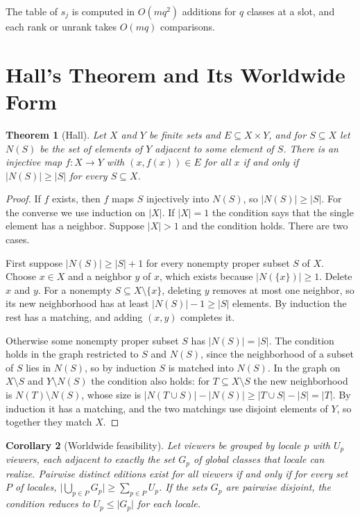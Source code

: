 \documentclass[11pt,twoside,openright]{book}
\theoremstyle{plain}
\newtheorem{theorem}{Theorem}[chapter]
\newtheorem{corollary}[theorem]{Corollary}
\theoremstyle{definition}
\theoremstyle{remark}
\begin{document}
The table of $s_j$ is computed in $O(m q^2)$ additions for $q$ classes at a slot, and each rank or unrank takes $O(mq)$ comparisons.

\section{Hall's Theorem and Its Worldwide Form}\label{sec:hallapp}

\begin{theorem}[Hall]\label{thm:hallapp}
Let $X$ and $Y$ be finite sets and $E\subseteq X\times Y$, and for $S\subseteq X$ let $N(S)$ be the set of elements of $Y$ adjacent to some element of $S$. There is an injective map $f:X\to Y$ with $(x,f(x))\in E$ for all $x$ if and only if $\lvert N(S)\rvert\ge\lvert S\rvert$ for every $S\subseteq X$.
\end{theorem}

\begin{proof}
If $f$ exists, then $f$ maps $S$ injectively into $N(S)$, so $\lvert N(S)\rvert\ge\lvert S\rvert$. For the converse we use induction on $\lvert X\rvert$. If $\lvert X\rvert=1$ the condition says that the single element has a neighbor. Suppose $\lvert X\rvert>1$ and the condition holds. There are two cases.

First suppose $\lvert N(S)\rvert\ge\lvert S\rvert+1$ for every nonempty proper subset $S$ of $X$. Choose $x\in X$ and a neighbor $y$ of $x$, which exists because $\lvert N(\{x\})\rvert\ge1$. Delete $x$ and $y$. For a nonempty $S\subseteq X\setminus\{x\}$, deleting $y$ removes at most one neighbor, so its new neighborhood has at least $\lvert N(S)\rvert-1\ge\lvert S\rvert$ elements. By induction the rest has a matching, and adding $(x,y)$ completes it.

Otherwise some nonempty proper subset $S$ has $\lvert N(S)\rvert=\lvert S\rvert$. The condition holds in the graph restricted to $S$ and $N(S)$, since the neighborhood of a subset of $S$ lies in $N(S)$, so by induction $S$ is matched into $N(S)$. In the graph on $X\setminus S$ and $Y\setminus N(S)$ the condition also holds: for $T\subseteq X\setminus S$ the new neighborhood is $N(T)\setminus N(S)$, whose size is $\lvert N(T\cup S)\rvert-\lvert N(S)\rvert\ge\lvert T\cup S\rvert-\lvert S\rvert=\lvert T\rvert$. By induction it has a matching, and the two matchings use disjoint elements of $Y$, so together they match $X$.
\end{proof}

\begin{corollary}[Worldwide feasibility]\label{cor:globalapp}
Let viewers be grouped by locale $p$ with $U_p$ viewers, each adjacent to exactly the set $G_p$ of global classes that locale can realize. Pairwise distinct editions exist for all viewers if and only if for every set $P$ of locales, $\bigl\lvert\bigcup_{p\in P}G_p\bigr\rvert\ge\sum_{p\in P}U_p$. If the sets $G_p$ are pairwise disjoint, the condition reduces to $U_p\le\lvert G_p\rvert$ for each locale.
\end{corollary}
\end{document}
